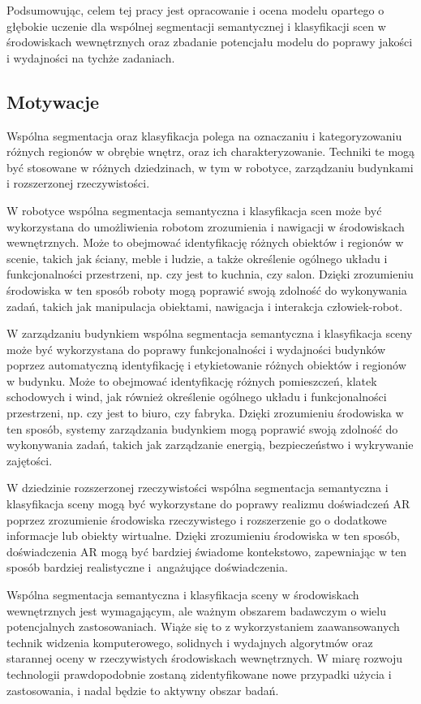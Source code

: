 Podsumowując, celem tej pracy jest opracowanie i ocena modelu opartego o głębokie uczenie dla wspólnej segmentacji semantycznej i klasyfikacji scen w środowiskach wewnętrznych oraz zbadanie potencjału modelu do poprawy jakości i wydajności na tychże zadaniach.

\subsection{Motywacje}
Wspólna segmentacja oraz klasyfikacja polega na oznaczaniu i kategoryzowaniu różnych regionów w obrębie wnętrz, oraz ich charakteryzowanie. Techniki te mogą być stosowane w różnych dziedzinach, w tym w robotyce, zarządzaniu budynkami i rozszerzonej rzeczywistości.

W robotyce wspólna segmentacja semantyczna i klasyfikacja scen może być wykorzystana do umożliwienia robotom zrozumienia i nawigacji w środowiskach wewnętrznych. Może to obejmować identyfikację różnych obiektów i regionów w scenie, takich jak ściany, meble i ludzie, a także określenie ogólnego układu i funkcjonalności przestrzeni, np. czy jest to kuchnia, czy salon. Dzięki zrozumieniu środowiska w ten sposób roboty mogą poprawić swoją zdolność do wykonywania zadań, takich jak manipulacja obiektami, nawigacja i interakcja człowiek-robot.

W zarządzaniu budynkiem wspólna segmentacja semantyczna i klasyfikacja sceny może być wykorzystana do poprawy funkcjonalności i wydajności budynków poprzez automatyczną identyfikację i etykietowanie różnych obiektów i regionów w budynku. Może to obejmować identyfikację różnych pomieszczeń, klatek schodowych i wind, jak również określenie ogólnego układu i funkcjonalności przestrzeni, np. czy jest to biuro, czy fabryka. Dzięki zrozumieniu środowiska w ten sposób, systemy zarządzania budynkiem mogą poprawić swoją zdolność do wykonywania zadań, takich jak zarządzanie energią, bezpieczeństwo i wykrywanie zajętości.

W dziedzinie rozszerzonej rzeczywistości wspólna segmentacja semantyczna i klasyfikacja sceny mogą być wykorzystane do poprawy realizmu doświadczeń AR poprzez zrozumienie środowiska rzeczywistego i rozszerzenie go o dodatkowe informacje lub obiekty wirtualne. Dzięki zrozumieniu środowiska w ten sposób, doświadczenia AR mogą być bardziej świadome kontekstowo, zapewniając w ten sposób bardziej realistyczne i~angażujące doświadczenia.

Wspólna segmentacja semantyczna i klasyfikacja sceny w środowiskach wewnętrznych jest wymagającym, ale ważnym obszarem badawczym o wielu potencjalnych zastosowaniach. Wiąże się to z wykorzystaniem zaawansowanych technik widzenia komputerowego, solidnych i wydajnych algorytmów oraz starannej oceny w rzeczywistych środowiskach wewnętrznych. W miarę rozwoju technologii prawdopodobnie zostaną zidentyfikowane nowe przypadki użycia i zastosowania, i nadal będzie to aktywny obszar badań.
